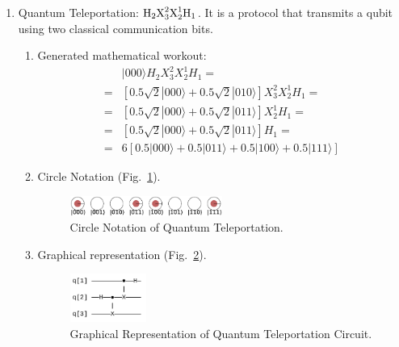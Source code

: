 \documentclass[sigconf,natbib=false]{acmart}
\begin{document}
\begin{enumerate}
		\item Quantum Teleportation: $\text{H}_2\text{X}^{2}_{3}\text{X}^{1}_{2}\text{H}_1$. It is a protocol that transmits a qubit using two classical communication bits.
        \begin{enumerate}
            \item Generated mathematical workout:
            \begin{align*}
            &|000\rangle H_{2}X_{3}^{2}X_{2}^{1}H_{1}=\\ 
                =& [0.5 \sqrt{2} |000\rangle +0.5 \sqrt{2} |010\rangle ]X_{3}^{2}X_{2}^{1}H_{1}=\\ 
                =& [0.5 \sqrt{2} |000\rangle +0.5 \sqrt{2} |011\rangle ]X_{2}^{1}H_{1}=\\ 
                =& [0.5 \sqrt{2} |000\rangle +0.5 \sqrt{2} |011\rangle ]H_{1}=\\ 
                =&6 [0.5 |000\rangle +0.5 |011\rangle +0.5 |100\rangle +0.5 |111\rangle ] 
            \end{align*}
            \item Circle Notation (Fig.~\ref{teleportation}). 
            \begin{figure}[!htb]
                \centerline{\includegraphics[width=0.5\textwidth]{teleportation}}
                \caption{Circle Notation of Quantum Teleportation.}
                \label{teleportation}
            \end{figure}
            \item Graphical representation (Fig.~\ref{teleportation_qc}).
            \begin{figure}[!htb]
                \centerline{\includegraphics[width=0.25\textwidth]{teleportation_qc}}
                \caption{Graphical Representation of Quantum Teleportation Circuit.}
                \label{teleportation_qc}
            \end{figure}
        \end{enumerate}
	\end{enumerate}
\end{document}

